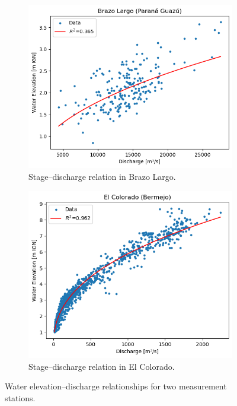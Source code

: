 \begin{figure}[h!]
    \centering

    \begin{subfigure}[t]{0.48\linewidth}
        \centering
        \includegraphics[width=\linewidth]{figures/ch5/wl discharge Brazo Largo.png}
        \caption{Stage–discharge relation in Brazo Largo.}
        \label{fig:wl_discharge_brazo}
    \end{subfigure}
    \hfill
    \begin{subfigure}[t]{0.48\linewidth}
        \centering
        \includegraphics[width=\linewidth]{figures/ch5/wl discharge El Colorado.png}
        \caption{Stage–discharge relation in El Colorado.}
        \label{fig:wl_discharge_colorado}
    \end{subfigure}

    \caption{Water elevation–discharge relationships for two measurement stations.}
    \label{fig:waterleveldischarge}
\end{figure}



